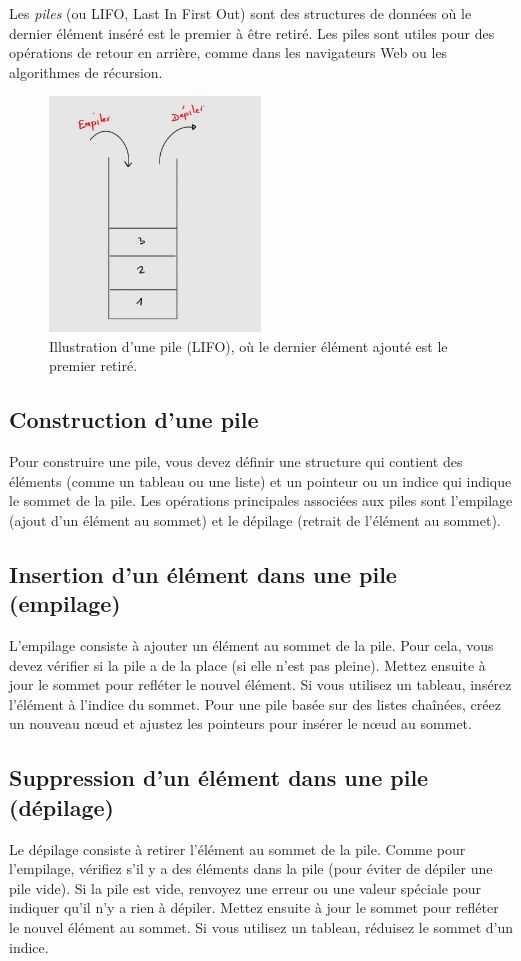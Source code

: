 Les \emph{piles} (ou LIFO, Last In First Out) sont des structures de données où le dernier élément inséré est le premier à être retiré. Les piles sont utiles pour des opérations de retour en arrière, comme dans les navigateurs Web ou les algorithmes de récursion.

\begin{figure}[H]
	\centering
	\includegraphics[width=0.5\textwidth]{image/stack} 
	\caption{Illustration d'une pile (LIFO), où le dernier élément ajouté est le premier retiré.}
\end{figure}

\subsection{Construction d'une pile}
Pour construire une pile, vous devez définir une structure qui contient des éléments (comme un tableau ou une liste) et un pointeur ou un indice qui indique le sommet de la pile. Les opérations principales associées aux piles sont l'empilage (ajout d'un élément au sommet) et le dépilage (retrait de l'élément au sommet).

\subsection{Insertion d'un élément dans une pile (empilage)}
L'empilage consiste à ajouter un élément au sommet de la pile. Pour cela, vous devez vérifier si la pile a de la place (si elle n'est pas pleine). Mettez ensuite à jour le sommet pour refléter le nouvel élément. Si vous utilisez un tableau, insérez l'élément à l'indice du sommet. Pour une pile basée sur des listes chaînées, créez un nouveau nœud et ajustez les pointeurs pour insérer le nœud au sommet.

\subsection{Suppression d'un élément dans une pile (dépilage)}
Le dépilage consiste à retirer l'élément au sommet de la pile. Comme pour l'empilage, vérifiez s'il y a des éléments dans la pile (pour éviter de dépiler une pile vide). Si la pile est vide, renvoyez une erreur ou une valeur spéciale pour indiquer qu'il n'y a rien à dépiler. Mettez ensuite à jour le sommet pour refléter le nouvel élément au sommet. Si vous utilisez un tableau, réduisez le sommet d'un indice.

